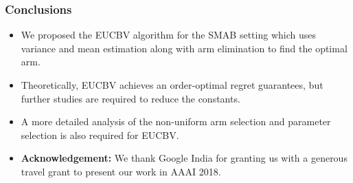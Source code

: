 \begin{frame}
\frametitle{Conclusions}
\begin{itemize}
\item<1-> We proposed the EUCBV algorithm for the SMAB setting which uses variance and mean estimation along with arm elimination to find the optimal arm.
\item<2-> Theoretically, EUCBV achieves an order-optimal regret guarantees, but further studies are required to reduce the constants.
\item<3-> A more detailed analysis of the non-uniform arm selection and parameter selection is also required for EUCBV.
\item<4-> \textbf{Acknowledgement: } We thank Google India for granting us with a generous travel grant to present our work in AAAI 2018.
\end{itemize}
\end{frame}
